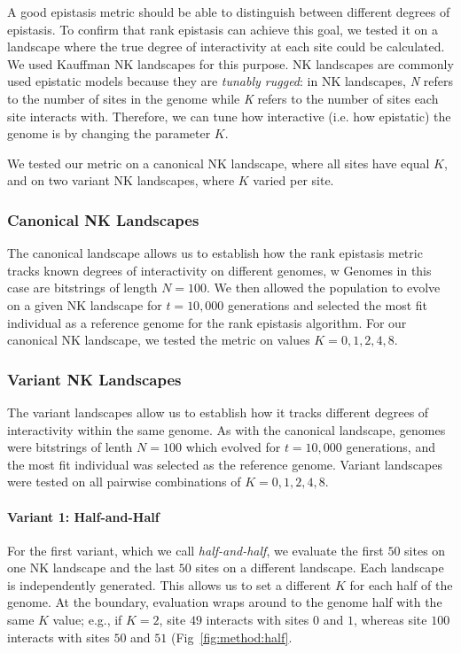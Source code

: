 A good epistasis metric should be able to distinguish between different degrees of epistasis. To confirm that rank epistasis can achieve this goal, we tested it on a landscape where the true degree of interactivity at each site could be calculated.
We used Kauffman NK landscapes \citep{kauffman_towards_1987} for this purpose.
NK landscapes are commonly used epistatic models because they are \textit{tunably rugged}: in NK landscapes, \textit{N} refers to the number of sites in the genome while \textit{K} refers to the number of sites each site interacts with.
Therefore, we can tune how interactive (i.e. how epistatic) the genome is by changing the parameter $K$. 

We tested our metric on a canonical NK landscape, where all sites have equal $K$, and on two variant NK landscapes, where $K$ varied per site. 

\subsubsection{Canonical NK Landscapes}

The canonical landscape allows us to establish how the rank epistasis metric tracks known degrees of interactivity on different genomes, w
Genomes in this case are bitstrings of length $N=100$.
We then allowed the population to evolve on a given NK landscape for $t=10,000$ generations and selected the most fit individual as a reference genome for the rank epistasis algorithm. 
For our canonical NK landscape, we tested the metric on values $K=0, 1, 2, 4, 8$. 

\subsubsection{Variant NK Landscapes}

The variant landscapes allow us to establish how it tracks different degrees of interactivity within the same genome.
As with the canonical landscape, genomes were bitstrings of lenth $N=100$ which evolved for $t=10,000$ generations, and the most fit individual was selected as the reference genome.
Variant landscapes were tested on all pairwise combinations of $K=0, 1, 2, 4, 8$. 

\paragraph{Variant 1: Half-and-Half}
For the first variant, which we call \textit{half-and-half}, we evaluate the first $50$ sites on one NK landscape and the last $50$ sites on a different landscape. Each landscape is independently generated. This allows us to set a different $K$ for each half of the genome. At the boundary, evaluation wraps around to the genome half with the same $K$ value; e.g., if $K=2$, site $49$ interacts with sites $0$ and $1$, whereas site $100$ interacts with sites $50$ and $51$ (Fig~\ref{fig:method:half}.

